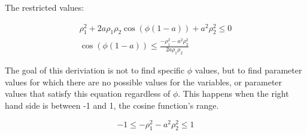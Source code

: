 \documentclass[12pt, a4paper, oneside]{report}
\begin{document}
The restricted values:

\begin{gather*}
  \rho_1 ^ 2 + 2 a \rho_1 \rho_2 \cos(\phi(1 - a)) + a ^ 2 \rho_2 ^ 2 \leqslant 0 \\
  \cos(\phi(1 - a)) \leqslant \frac{-\rho_1 ^ 2 - a ^ 2 \rho_2 ^ 2}{2 a \rho_1 \rho_2}
\end{gather*}  

The goal of this deriviation is not to find specific $\phi$ values, but to find parameter values for which there are no possible values for the variables, or parameter values that satisfy this equation regardless of $\phi$. This happens when the right hand side is between -1 and 1, the cosine function's range.

\begin{equation*}
-1 \leqslant -\rho_1 ^ 2 - a ^ 2 \rho_2 ^ 2 \leqslant 1
\end{equation*}
\end{document}
